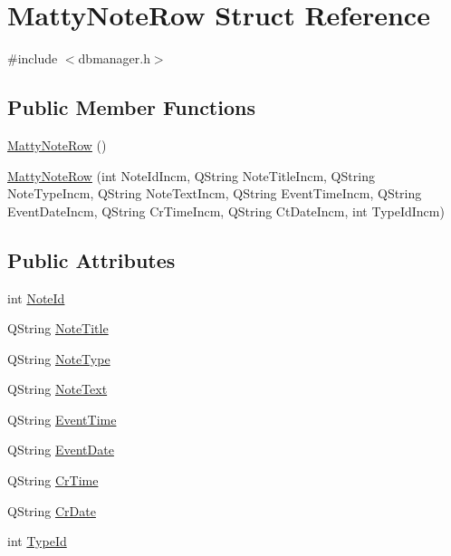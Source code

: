\hypertarget{struct_matty_note_row}{}\section{Matty\+Note\+Row Struct Reference}
\label{struct_matty_note_row}


{\ttfamily \#include $<$dbmanager.\+h$>$}

\subsection*{Public Member Functions}
\begin{DoxyCompactItemize}
\item 
\hyperlink{struct_matty_note_row_a372de424a96d2c8378a7d63038c2e885}{Matty\+Note\+Row} ()
\item 
\hyperlink{struct_matty_note_row_a8c78d41b12b98ec07c00986fb50b972a}{Matty\+Note\+Row} (int Note\+Id\+Incm, Q\+String Note\+Title\+Incm, Q\+String Note\+Type\+Incm, Q\+String Note\+Text\+Incm, Q\+String Event\+Time\+Incm, Q\+String Event\+Date\+Incm, Q\+String Cr\+Time\+Incm, Q\+String Ct\+Date\+Incm, int Type\+Id\+Incm)
\end{DoxyCompactItemize}
\subsection*{Public Attributes}
\begin{DoxyCompactItemize}
\item 
int \hyperlink{struct_matty_note_row_adf7ad98c06f6f189fba86827de089f63}{Note\+Id}
\item 
Q\+String \hyperlink{struct_matty_note_row_ab9c1d123c0e7caabfe6291b87b13628b}{Note\+Title}
\item 
Q\+String \hyperlink{struct_matty_note_row_a429bf85e7d1ef676e6dde1ca42d79313}{Note\+Type}
\item 
Q\+String \hyperlink{struct_matty_note_row_a0d52bdab09c2d327d3cd87b25dd3183b}{Note\+Text}
\item 
Q\+String \hyperlink{struct_matty_note_row_a91ba785c3593a383d6d31666c0161a9d}{Event\+Time}
\item 
Q\+String \hyperlink{struct_matty_note_row_afa20c714519106f6eb5c62ce2e322486}{Event\+Date}
\item 
Q\+String \hyperlink{struct_matty_note_row_a6da7cf89340efb4ccea7e0cabb3a4e62}{Cr\+Time}
\item 
Q\+String \hyperlink{struct_matty_note_row_a7ea40f8ba0fb9ad7642fdaeb29c7e306}{Cr\+Date}
\item 
int \hyperlink{struct_matty_note_row_a5720bf28d6c35044d52ad8a098004259}{Type\+Id}
\end{DoxyCompactItemize}


